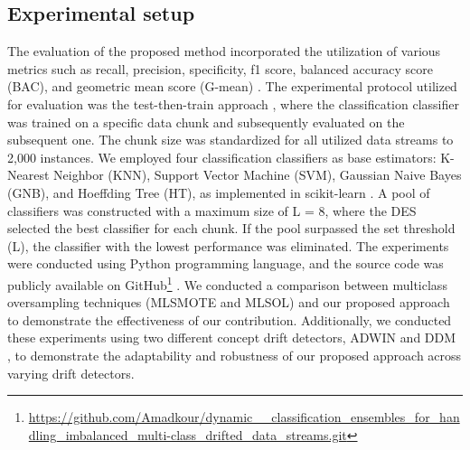 \subsection{Experimental setup}
The evaluation of the proposed method incorporated the utilization of various metrics such as recall, precision, specificity, f1 score, balanced accuracy score (BAC), and geometric mean score (G-mean) \cite{bu2016pdf}. The experimental protocol utilized for evaluation was the test-then-train approach \cite{venkatasubramanianinformation}, where the classification classifier was trained on a specific data chunk and subsequently evaluated on the subsequent one. The chunk size was standardized for all utilized data streams to 2,000 instances. We employed four classification classifiers as base estimators: K-Nearest Neighbor (KNN), Support Vector Machine (SVM), Gaussian Naive Bayes (GNB), and Hoeffding Tree (HT), as implemented in scikit-learn \cite{frias2014online}. A pool of classifiers was constructed with a maximum size of L = 8, where the DES selected the best classifier for each chunk. If the pool surpassed the set threshold (L), the classifier with the lowest performance was eliminated. The experiments were conducted using Python programming language, and the source code was publicly available on GitHub\footnote{\url{https://github.com/Amadkour/dynamic__classification_ensembles_for_handling_imbalanced_multi-class_drifted_data_streams.git}} . We conducted a comparison between multiclass oversampling techniques (MLSMOTE and MLSOL) and our proposed approach to demonstrate the effectiveness of our contribution. Additionally, we conducted these experiments using two different concept drift detectors, ADWIN \cite{storkey2008training} and DDM \cite{losing2016knn}, to demonstrate the adaptability and robustness of our proposed approach across varying drift detectors.

